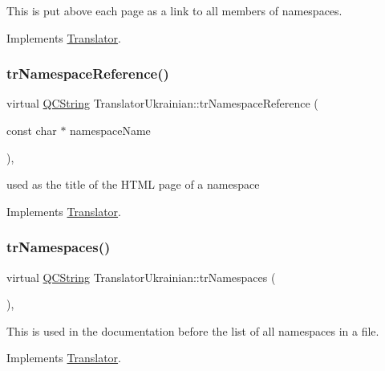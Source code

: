 This is put above each page as a link to all members of namespaces. 

Implements \mbox{\hyperlink{class_translator}{Translator}}.

\mbox{\label{class_translator_ukrainian_a193f7287049bfa7d0dc6a9b11909e20b}} 
\subsubsection{\texorpdfstring{trNamespaceReference()}{trNamespaceReference()}}
{\footnotesize\ttfamily virtual \mbox{\hyperlink{class_q_c_string}{Q\+C\+String}} Translator\+Ukrainian\+::tr\+Namespace\+Reference (\begin{DoxyParamCaption}\item[{const char $\ast$}]{namespace\+Name }\end{DoxyParamCaption})\hspace{0.3cm}{\ttfamily [inline]}, {\ttfamily [virtual]}}

used as the title of the H\+T\+ML page of a namespace 

Implements \mbox{\hyperlink{class_translator}{Translator}}.

\mbox{\label{class_translator_ukrainian_aed6e57549263ae761eb3ba3d37829f22}} 
\subsubsection{\texorpdfstring{trNamespaces()}{trNamespaces()}}
{\footnotesize\ttfamily virtual \mbox{\hyperlink{class_q_c_string}{Q\+C\+String}} Translator\+Ukrainian\+::tr\+Namespaces (\begin{DoxyParamCaption}{ }\end{DoxyParamCaption})\hspace{0.3cm}{\ttfamily [inline]}, {\ttfamily [virtual]}}

This is used in the documentation before the list of all namespaces in a file. 

Implements \mbox{\hyperlink{class_translator}{Translator}}.

